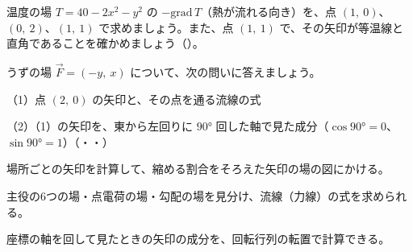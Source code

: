 \bkproblem 温度の場 $T=40-2x^2-y^2$ の $-\mathrm{grad}\,T$（熱が流れる向き）を、点 $(1,\ 0)$、$(0,\ 2)$、$(1,\ 1)$ で求めましょう。また、点 $(1,\ 1)$ で、その矢印が等温線と直角であることを確かめましょう\mbox{（）}。

\bkproblem うずの場 $\vec F=(-y,\ x)$ について、次の問いに答えましょう。\par
（1）点 $(2,\ 0)$ の矢印と、その点を通る流線の式\par
（2）（1）の矢印を、東から左回りに $90°$ 回した軸で見た成分（$\cos90°=0$、$\sin90°=1$）\mbox{（・・）}

\begin{furikaeri}
\begin{checklist}
\item 場所ごとの矢印を計算して、縮める割合をそろえた矢印の場の図にかける。
\item 主役の6つの場・点電荷の場・勾配の場を見分け、流線（力線）の式を求められる。
\item 座標の軸を回して見たときの矢印の成分を、回転行列の転置で計算できる。
\end{checklist}
\end{furikaeri}
